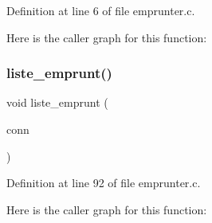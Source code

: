 Definition at line 6 of file emprunter.\+c.

Here is the caller graph for this function\+:
\mbox{\label{emprunter_8h_a7b615bb15707628327462e2deaf4f2ce}} 
\subsubsection{liste\+\_\+emprunt()}
{\footnotesize\ttfamily void liste\+\_\+emprunt (\begin{DoxyParamCaption}\item[{M\+Y\+S\+QL $\ast$}]{conn }\end{DoxyParamCaption})}



Definition at line 92 of file emprunter.\+c.

Here is the caller graph for this function\+:
